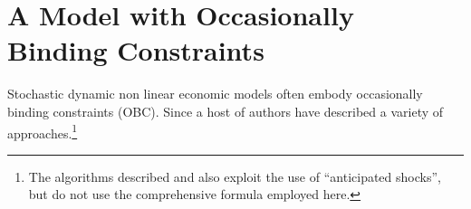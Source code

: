 \documentclass[12pt]{article}
\begin{document}





  




\section{A Model with Occasionally Binding Constraints}
\label{sec:occbind}



\label{sec:obc-solut}

Stochastic dynamic non linear economic
models often embody  occasionally binding constraints (OBC).
Since \citep{Christiano2000} a host of
authors have described a variety of approaches.\footnote{The algorithms described \citep{holden15:_exist_dsge} and \citep{guerrieri15:_occbin} also exploit the use of ``anticipated shocks'', but do not use the comprehensive formula employed here. }
\citep{holden15:_exist_dsge,guerrieri15:_occbin,benigno09,hintermaier10,brumm10,nakov08,haefke98,nakata12,gordon11,billi11,Hintermaier2010,Guerrieri2015}


\label{sec:folag}
\end{document}
